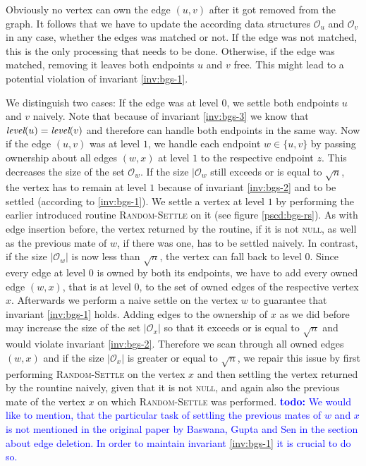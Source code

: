 \documentclass{article}      %
\newcommand\todo[1]{\textcolor{blue}{\textbf{todo: }#1}}
\DeclareMathOperator\level{\emph{level}}
\begin{document}
Obviously no vertex can own the edge $(u,v)$ after it got removed from the graph. It follows that we have to update the according data structures $\mathcal{O}_u$ and $\mathcal{O}_v$ in any case, whether the edges was matched or not. If the edge was not matched, this is the only processing that needs to be done. Otherwise, if the edge was matched, removing it leaves both endpoints $u$ and $v$ free. This might lead to a potential violation of invariant \ref{inv:bgs-1}. 

We distinguish two cases: If the edge was at level $0$, we settle both endpoints $u$ and $v$ naively. Note that because of invariant \ref{inv:bgs-3} we know that $\level(u)=\level(v)$ and therefore can handle both endpoints in the same way. Now if the edge $(u,v)$ was at level $1$, we handle each endpoint $w \in \{u,v\}$ by passing ownership about all edges $(w,x)$ at level $1$ to the respective endpoint $z$. This decreases the size of the set $\mathcal{O}_w$. If the size $|\mathcal{O}_w$ still exceeds or is equal to $\sqrt{n}$, the vertex has to remain at level $1$ because of invariant \ref{inv:bgs-2} and to be settled (according to \ref{inv:bgs-1}). We settle a vertex at level $1$ by performing the earlier introduced routine \textsc{Random-Settle} on it (see figure \ref{pscd:bgs-rs}). As with edge insertion before, the vertex returned by the routine, if it is not \textsc{null}, as well as the previous mate of $w$, if there was one, has to be settled naively. In contrast, if the size $|\mathcal{O}_w|$ is now less than $\sqrt{n}$, the vertex can fall back to level $0$. Since every edge at level $0$ is owned by both its endpoints, we have to add every owned edge $(w,x)$, that is at level $0$, to the set of owned edges of the respective vertex $x$. Afterwards we perform a naive settle on the vertex $w$ to guarantee that invariant \ref{inv:bgs-1} holds. Adding edges to the ownership of $x$ as we did before may increase the size of the set $|\mathcal{O}_x|$ so that it exceeds or is equal to $\sqrt{n}$ and would violate invariant \ref{inv:bgs-2}. Therefore we scan through all owned edges $(w,x)$ and if the size $|\mathcal{O}_x|$ is greater or equal to $\sqrt{n}$, we repair this issue by first performing \textsc{Random-Settle} on the vertex $x$ and then settling the vertex returned by the rountine naively, given that it is not \textsc{null}, and again also the previous mate of the vertex $x$ on which \textsc{Random-Settle} was performed. \todo{We would like to mention, that the particular task of settling the previous mates of $w$ and $x$ is not mentioned in the original paper by Baswana, Gupta and Sen in the section about edge deletion. In order to maintain invariant \ref{inv:bgs-1} it is crucial to do so.}
\end{document}
